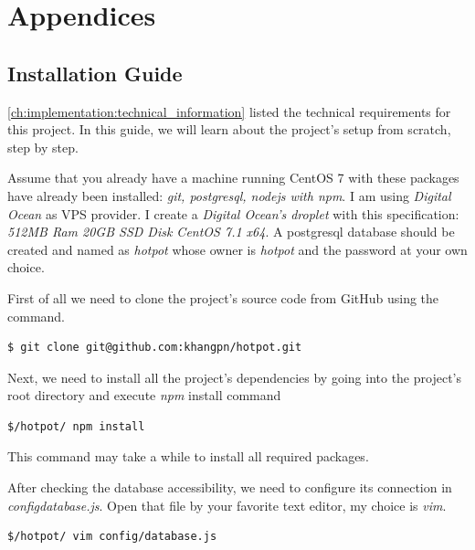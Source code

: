 
\chapter{Appendices}
\label{ch:appendix-a}


\section{Installation Guide}
\label{ch:appendix-a:installation_guide}

\autoref{ch:implementation:technical_information} listed the technical requirements for this project.
In this guide, we will learn about the project's setup from scratch, step by step.

Assume that you already have a machine running CentOS 7 with these packages have already been installed: \emph{git, postgresql, nodejs with npm}.
I am using \emph{Digital Ocean} as VPS provider.
I create a \emph{Digital Ocean's droplet} with this specification: \emph{512MB Ram 20GB SSD Disk CentOS 7.1 x64}.
A postgresql database should be created and named as \emph{hotpot} whose owner is \emph{hotpot} and the password at your own choice.

First of all we need to clone the project's source code from GitHub using the command.
\begin{lstlisting}[breaklines=false,frame=lt]
$ git clone git@github.com:khangpn/hotpot.git
\end{lstlisting}

Next, we need to install all the project's dependencies by going into the project's root directory and execute \emph{npm} install command
\begin{lstlisting}[breaklines=false,frame=lt]
$/hotpot/ npm install
\end{lstlisting}
This command may take a while to install all required packages.

After checking the database accessibility, we need to configure its connection in \emph{config\/database.js}. 
Open that file by your favorite text editor, my choice is \emph{vim}. 
\begin{lstlisting}[breaklines=false,frame=lt]
$/hotpot/ vim config/database.js
\end{lstlisting}

